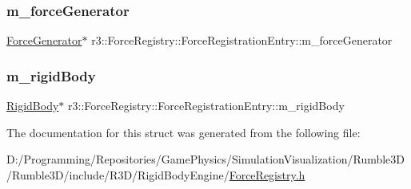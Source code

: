 \subsubsection{\texorpdfstring{m\+\_\+force\+Generator}{m\_forceGenerator}}
{\footnotesize\ttfamily \mbox{\hyperlink{classr3_1_1_force_generator}{Force\+Generator}}$\ast$ r3\+::\+Force\+Registry\+::\+Force\+Registration\+Entry\+::m\+\_\+force\+Generator}

\mbox{\label{structr3_1_1_force_registry_1_1_force_registration_entry_a103ff58c0c8f46f2ed1927976bc5dc87}} 
\subsubsection{\texorpdfstring{m\+\_\+rigid\+Body}{m\_rigidBody}}
{\footnotesize\ttfamily \mbox{\hyperlink{classr3_1_1_rigid_body}{Rigid\+Body}}$\ast$ r3\+::\+Force\+Registry\+::\+Force\+Registration\+Entry\+::m\+\_\+rigid\+Body}



The documentation for this struct was generated from the following file\+:\begin{DoxyCompactItemize}
\item 
D\+:/\+Programming/\+Repositories/\+Game\+Physics/\+Simulation\+Visualization/\+Rumble3\+D/\+Rumble3\+D/include/\+R3\+D/\+Rigid\+Body\+Engine/\mbox{\hyperlink{_force_registry_8h}{Force\+Registry.\+h}}\end{DoxyCompactItemize}
